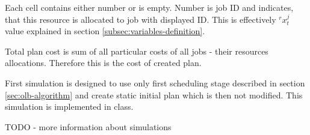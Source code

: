 Each cell contains either number or is empty.
Number is job ID and indicates, that this resource is allocated to job with displayed ID.
This is effectively $^{r}x_{t}^{j}$ value explained in section \ref{subsec:variables-definition}.

Total plan cost is sum of all particular costs of all jobs - their resources allocations.
Therefore this is the cost of created plan.

First simulation is designed to use only first scheduling stage described in section \ref{sec:olb-algorithm}
and create static initial plan which is then not modified.
This simulation is implemented in  class.

TODO - more information about simulations